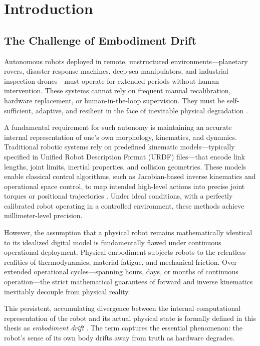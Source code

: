 \documentclass[12pt,a4paper,oneside]{report}
\begin{document}
\chapter{Introduction}
\label{chap:intro}

\section{The Challenge of Embodiment Drift}
\label{sec:challenge_embodiment_drift}

Autonomous robots deployed in remote, unstructured environments—planetary rovers, disaster-response machines, deep-sea manipulators, and industrial inspection drones—must operate for extended periods without human intervention. These systems cannot rely on frequent manual recalibration, hardware replacement, or human-in-the-loop supervision. They must be self-sufficient, adaptive, and resilient in the face of inevitable physical degradation \cite{bongard2006resilient, cully2015robots}.

A fundamental requirement for such autonomy is maintaining an accurate internal representation of one's own morphology, kinematics, and dynamics. Traditional robotic systems rely on predefined kinematic models—typically specified in Unified Robot Description Format (URDF) files—that encode link lengths, joint limits, inertial properties, and collision geometries. These models enable classical control algorithms, such as Jacobian-based inverse kinematics and operational space control, to map intended high-level actions into precise joint torques or positional trajectories \cite{siciliano2009robotics}. Under ideal conditions, with a perfectly calibrated robot operating in a controlled environment, these methods achieve millimeter-level precision.

However, the assumption that a physical robot remains mathematically identical to its idealized digital model is fundamentally flawed under continuous operational deployment. Physical embodiment subjects robots to the relentless realities of thermodynamics, material fatigue, and mechanical friction. Over extended operational cycles—spanning hours, days, or months of continuous operation—the strict mathematical guarantees of forward and inverse kinematics inevitably decouple from physical reality.

This persistent, accumulating divergence between the internal computational representation of the robot and its actual physical state is formally defined in this thesis as \textit{embodiment drift} \cite{bongard2006resilient, kwiatkowski2019task}. The term captures the essential phenomenon: the robot's sense of its own body drifts away from truth as hardware degrades.
\end{document}
